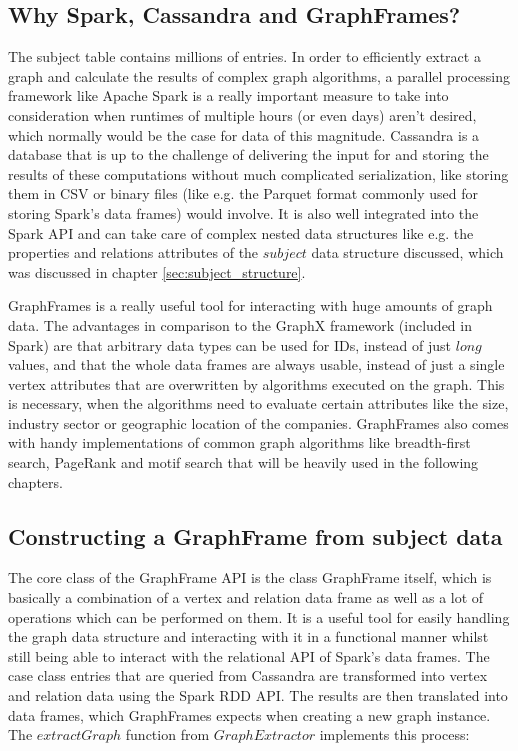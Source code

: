 \documentclass[
  a4paper,     %
  titlepage,   %
  oneside,     %
  parskip      %
]{scrartcl}          %
\begin{document}
    \subsection{Why Spark, Cassandra and GraphFrames?}
    The subject table contains millions of entries. In order to efficiently extract
    a graph and calculate the results of complex graph algorithms, a parallel processing
    framework like Apache Spark is a really important measure to take into consideration when runtimes
    of multiple hours (or even days) aren't desired, which normally would be the case for data of this magnitude.
    Cassandra is a database that is up to the challenge of delivering the input for and storing the results of
    these computations without much complicated serialization, like storing them
    in CSV or binary files (like e.g. the Parquet format commonly used for storing Spark's data frames) would involve.
    It is also well integrated into the Spark API and can take care of complex nested
    data structures like e.g. the properties and relations attributes of the $subject$
    data structure discussed, which was discussed in chapter \ref{sec:subject_structure}.

    GraphFrames is a really useful tool for interacting with huge amounts of graph
    data. The advantages in comparison to the GraphX framework (included in Spark) are that arbitrary data types
    can be used for IDs, instead of just $long$ values, and that the whole data frames
    are always usable, instead of just a single vertex attributes that are overwritten
    by algorithms executed on the graph. This is necessary, when the algorithms need to
    evaluate certain attributes like the size, industry sector or geographic location of the companies.
    GraphFrames also comes with handy implementations
    of common graph algorithms like breadth-first search, PageRank and motif search
    that will be heavily used in the following chapters.

    \subsection{Constructing a GraphFrame from subject data}
    \label{sec:graphframe_construction}
    The core class of the GraphFrame API is the class GraphFrame itself, which
    is basically a combination of a vertex and relation data frame as well as a
    lot of operations which can be performed on them. It is a useful tool for
    easily handling the graph data structure and interacting with it in a functional
    manner whilst still being able to interact with the relational API of Spark's data frames.
    The case class entries that are queried from Cassandra are transformed into vertex
    and relation data using the Spark RDD API. The results are then translated into
    data frames, which GraphFrames expects when creating a new graph instance.\\
    The $extractGraph$ function from $GraphExtractor$ implements this process:
\end{document}
